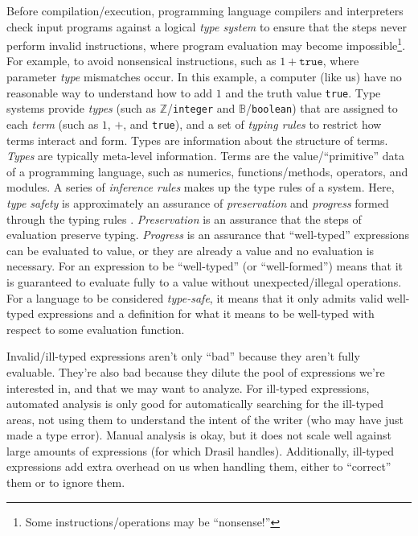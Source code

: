 Before compilation/execution, programming language compilers and interpreters
check input programs against a logical \textit{type system} to ensure that the
steps never perform invalid instructions, where program evaluation may become
impossible\footnote{Some instructions/operations may be ``nonsense!''}. For
example, to avoid nonsensical instructions, such as \(1 + \texttt{true}\), where
parameter \textit{type} mismatches occur. In this example, a computer (like us)
have no reasonable way to understand how to add \(1\) and the truth value
\texttt{true}. Type systems provide \textit{types} (such as
\(\mathbb{Z}\)/\texttt{integer} and \(\mathbb{B}\)/\texttt{boolean}) that are
assigned to each \textit{term} (such as \(1\), \(+\), and \texttt{true}), and a
set of \textit{typing rules} to restrict how terms interact and form. Types are
information about the structure of terms. \textit{Types} are typically
meta-level information. Terms are the value/``primitive'' data of a programming
language, such as numerics, functions/methods, operators, and modules. A series
of \textit{inference rules} makes up the type rules of a system. Here,
\textit{type safety} is approximately an assurance of \textit{preservation} and
\textit{progress} formed through the typing rules \cite{Harper2016}.
\textit{Preservation} is an assurance that the steps of evaluation preserve
typing. \textit{Progress} is an assurance that ``well-typed'' expressions can be
evaluated to value, or they are already a value and no evaluation is necessary.
For an expression to be ``well-typed'' (or ``well-formed'') means that it is
guaranteed to evaluate fully to a value without unexpected/illegal operations.
For a language to be considered \textit{type-safe}, it means that it only admits
valid well-typed expressions and a definition for what it means to be well-typed
with respect to some evaluation function.

Invalid/ill-typed expressions aren't only ``bad'' because they aren't fully
evaluable. They're also bad because they dilute the pool of expressions we're
interested in, and that we may want to analyze. For ill-typed expressions,
automated analysis is only good for automatically searching for the ill-typed
areas, not using them to understand the intent of the writer (who may have just
made a type error). Manual analysis is okay, but it does not scale well against
large amounts of expressions (for which Drasil handles). Additionally, ill-typed
expressions add extra overhead on us when handling them, either to ``correct''
them or to ignore them.

